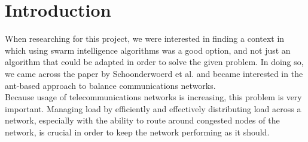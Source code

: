 
\section{Introduction}
\label{sec:intro}

When researching for this project, we were interested in finding a context in which using swarm intelligence algorithms was a good option, and not just an algorithm that could be adapted in order to solve the given problem. In doing so, we came across the paper by Schoonderwoerd et al. and became interested in the ant-based approach to balance communications networks.\\

Because usage of telecommunications networks is increasing, this problem is very important. Managing load by efficiently and effectively distributing load across a network, especially with the ability to route around congested nodes of the network, is crucial in order to keep the network performing as it should. \\